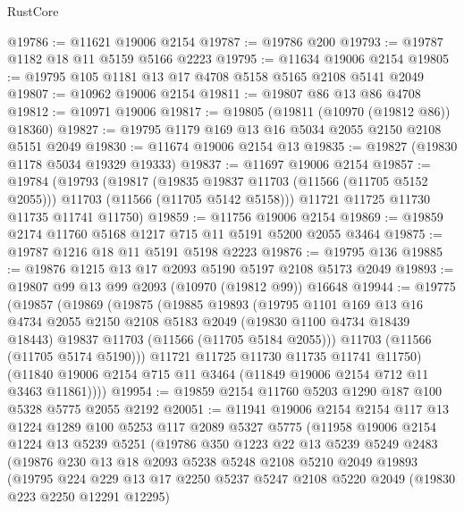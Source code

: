 \begin{lexlean}{RustCore}
\begin{coremodule}
@19786 := @11621 @19006 @2154
@19787 := @19786 @200
@19793 := @19787 @1182 @18 @11 @5159 @5166 @2223
@19795 := @11634 @19006 @2154
@19805 := @19795 @105 @1181 @13 @17 @4708 @5158 @5165 @2108 @5141 @2049
@19807 := @10962 @19006 @2154
@19811 := @19807 @86 @13 @86 @4708
@19812 := @10971 @19006
@19817 := @19805 (@19811 (@10970 (@19812 @86)) @18360)
@19827 := @19795 @1179 @169 @13 @16 @5034 @2055 @2150 @2108 @5151 @2049
@19830 := @11674 @19006 @2154 @13
@19835 := @19827 (@19830 @1178 @5034 @19329 @19333)
@19837 := @11697 @19006 @2154
@19857 := @19784
    (@19793
      (@19817
        (@19835 @19837 @11703 (@11566 (@11705 @5152 @2055)))
        @11703
        (@11566 (@11705 @5142 @5158)))
      @11721
      @11725
      @11730
      @11735
      @11741
      @11750)
@19859 := @11756 @19006 @2154
@19869 := @19859 @2174 @11760 @5168 @1217 @715 @11 @5191 @5200 @2055 @3464
@19875 := @19787 @1216 @18 @11 @5191 @5198 @2223
@19876 := @19795 @136
@19885 := @19876 @1215 @13 @17 @2093 @5190 @5197 @2108 @5173 @2049
@19893 := @19807 @99 @13 @99 @2093 (@10970 (@19812 @99)) @16648
@19944 := @19775
    (@19857
      (@19869
        (@19875
          (@19885
            @19893
            (@19795
              @1101
              @169
              @13
              @16
              @4734
              @2055
              @2150
              @2108
              @5183
              @2049
              (@19830 @1100 @4734 @18439 @18443)
              @19837
              @11703
              (@11566 (@11705 @5184 @2055)))
            @11703
            (@11566 (@11705 @5174 @5190)))
          @11721
          @11725
          @11730
          @11735
          @11741
          @11750)
        (@11840 @19006 @2154 @715 @11 @3464 (@11849 @19006 @2154 @712 @11 @3463 @11861))))
@19954 := @19859 @2154 @11760 @5203 @1290 @187 @100 @5328 @5775 @2055 @2192
@20051 := @11941
    @19006
    @2154
    @2154
    @117
    @13
    @1224
    @1289
    @100
    @5253
    @117
    @2089
    @5327
    @5775
    (@11958
      @19006
      @2154
      @1224
      @13
      @5239
      @5251
      (@19786
        @350
        @1223
        @22
        @13
        @5239
        @5249
        @2483
        (@19876
          @230
          @13
          @18
          @2093
          @5238
          @5248
          @2108
          @5210
          @2049
          @19893
          (@19795
            @224
            @229
            @13
            @17
            @2250
            @5237
            @5247
            @2108
            @5220
            @2049
            (@19830 @223 @2250 @12291 @12295)

\end{coremodule}
\end{lexlean}
